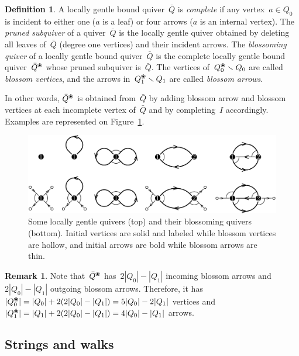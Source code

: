 \documentclass{amsart}
\theoremstyle{definition}
\newtheorem{definition}[theorem]{Definition}
\newtheorem{remark}[theorem]{Remark}
\newcommand{\ssm}{\smallsetminus} %
\newcommand{\fref}[1]{Figure~\ref{#1}} %
\newcommand{\darkblue}{\color{darkblue}} %
\newcommand{\defn}[1]{\textsl{\darkblue #1}} %
\newcommand{\blossom}{^\text{\ding{96}}} %
\begin{document}
\begin{definition}%
\label{def:blossomingQuiver}
A locally gentle bound quiver~$\bar Q$ is \defn{complete} if any vertex~$a \in Q_0$ is incident to either one ($a$ is a leaf) or four arrows ($a$ is an internal vertex).
The \defn{pruned subquiver} of a quiver~$\bar Q$ is the locally gentle quiver obtained by deleting all leaves of~$\bar Q$ (degree one vertices) and their incident arrows.
The \defn{blossoming quiver} of a locally gentle bound quiver~$\bar Q$ is the complete locally gentle bound quiver~$\bar Q\blossom$ whose pruned subquiver is~$\bar Q$.
The vertices of~$Q\blossom_0 \ssm Q_0$ are called \defn{blossom vertices}, and the arrows in~$Q\blossom_1 \ssm Q_1$ are called \defn{blossom arrows}.
\end{definition}

In other words, $\bar Q\blossom$ is obtained from~$\bar Q$ by adding blossom arrow and blossom vertices at each incomplete vertex of~$\bar Q$ and by completing~$I$ accordingly.
Examples are represented on \fref{fig:quivers}.

\begin{figure}[t]
	\capstart
	\centerline{\includegraphics[scale=.6]{quivers}}
	\caption{Some locally gentle quivers (top) and their blossoming quivers (bottom). Initial vertices are solid and labeled while blossom vertices are hollow, and initial arrows are bold while blossom arrows are thin.}
	\label{fig:quivers}
\end{figure}

\begin{remark}
\label{rem:sizeBlossomingQuiver}
Note that~$\bar Q\blossom$ has~$2|Q_0|-|Q_1|$ incoming blossom arrows and~$2|Q_0|-|Q_1|$ outgoing blossom arrows.
Therefore, it has $|Q_0\blossom| = |Q_0| + 2(2|Q_0|-|Q_1|) = 5|Q_0|-2|Q_1|$ vertices and~${|Q_1\blossom| = |Q_1| + 2(2|Q_0|-|Q_1|) = 4|Q_0|-|Q_1|}$ arrows.
\end{remark}

\subsection{Strings and walks}
\end{document}

